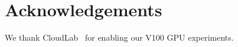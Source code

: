 \section*{Acknowledgements}
We thank CloudLab~\cite{cloudlab} for enabling our V100 GPU experiments.
